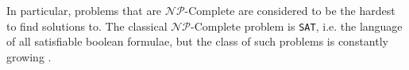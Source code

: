 \documentclass{article}
\begin{document}
In particular, problems that are $\mathcal{NP}$-Complete are considered to be the hardest to find solutions to. The classical $\mathcal{NP}$-Complete problem is \texttt{SAT}, i.e. the language of all satisfiable boolean formulae, but the class of such problems is constantly growing \cite{karpReducibilityCombinatorialProblems1972}. 




\end{document}
